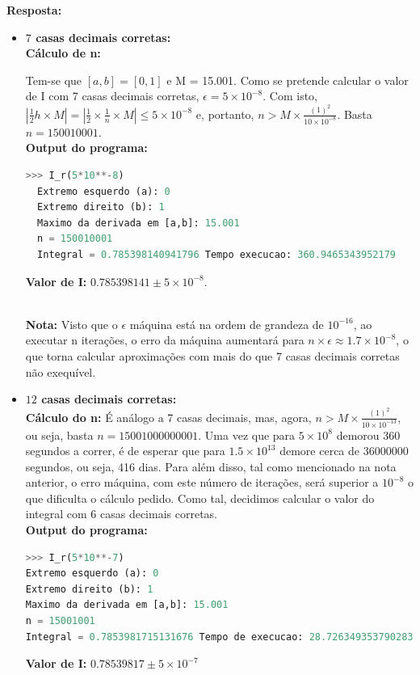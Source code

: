\documentclass{article}
\begin{document}
\textbf{Resposta:}
\begin{itemize}
  \item{\textbf{$7$ casas decimais corretas:}\\[2mm]
  \textbf{Cálculo de n:} \par Tem-se que $[a,b] = [0,1]$ e M = 15.001. Como se pretende calcular o valor de I com 7 casas decimais corretas, $\epsilon = 5\times 10^{-8}$. Com isto, $\left|\frac{1}{2}h\times M \right| = \left|\frac{1}{2}\times \frac{1}{n} \times M \right|\leq 5\times10^{-8}$ e, portanto, $n > M\times \frac{(1)^{2}}{10\times 10^{-8}}$. Basta $ n = 150010001$. \\[2mm]
  \textbf{Output do programa:}
  \begin{lstlisting}[language=Python]
  >>> I_r(5*10**-8)
  Extremo esquerdo (a): 0
  Extremo direito (b): 1
  Maximo da derivada em [a,b]: 15.001
  n = 150010001
  Integral = 0.785398140941796 Tempo execucao: 360.9465343952179  \end{lstlisting}
  \textbf{Valor de I:} $0.785398141 \pm 5\times10^{-8}$.}\\[2mm]
  \textbf{Nota:} Visto que o $\epsilon$ máquina está na ordem de grandeza de $10^{-16}$, ao executar n iterações, o erro da máquina aumentará para $n\times\epsilon\approx1.7\times10^{-8}$, o que torna calcular aproximações com mais do que 7 casas decimais corretas não exequível.
  \newpage
  \item {\textbf{$12$ casas decimais corretas:}\\[2mm]
  \textbf{Cálculo do n:}
  É análogo a 7 casas decimais, mas, agora, $n > M\times \frac{(1)^{2}}{10\times 10^{-13}}$, ou seja, basta $ n = 15001000000001$. Uma vez que para $5\times10^{8}$ demorou 360 segundos a correr, é de esperar que para $1.5\times10^{13}$ demore cerca de 36000000 segundos, ou seja, 416 dias. Para além disso, tal como mencionado na nota anterior, o erro máquina, com este número de iterações, será superior a $10^{-8}$ o que dificulta o cálculo pedido. Como tal, decidimos calcular o valor do integral com 6 casas decimais corretas.\\[2mm]
  \textbf{Output do programa:}
  \begin{lstlisting}[language = Python]
  >>> I_r(5*10**-7)
Extremo esquerdo (a): 0
Extremo direito (b): 1
Maximo da derivada em [a,b]: 15.001
n = 15001001
Integral = 0.7853981715131676 Tempo de execucao: 28.726349353790283\end{lstlisting}
\textbf{Valor de I:} $0.78539817\pm5\times10^{-7}$
}\end{itemize}
\end{document}
